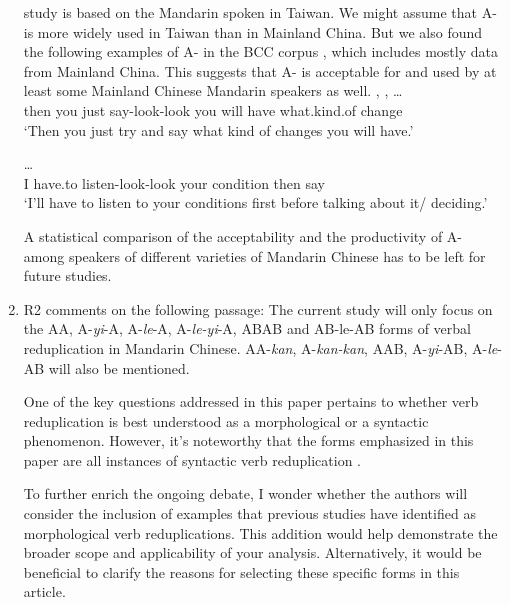 \documentclass[fleqn,twoside]{article}
\begin{document}
\begin{enumerate}
 study is based on the Mandarin spoken in Taiwan.
We might assume that A- is more widely used in Taiwan than in Mainland China.
But we also found the following examples of A- in the BCC corpus \citep{BCC}, which includes mostly data from Mainland China.
This suggests that A- is acceptable for and used by at least some Mainland Chinese Mandarin speakers as well.
\ea %
\gll {},   ,     \ldots\\
then you just say-look-look you will have what.kind.of change\\
\glt `Then you just try and say what kind of changes you will have.'
\z

\ea %
\gll {}      \ldots\\
I have.to listen-look-look your condition then say\\
\glt `I'll have to listen to your conditions first before talking about it/ deciding.'
\z

A statistical comparison of the acceptability and the productivity of A- among speakers of different varieties of Mandarin Chinese has to be left for future studies.

\item
\begin{displayquote}
R2 comments on the following passage: The current study will only focus on the AA, A-\textit{yi}-A, A-\textit{le}-A, A-\textit{le-yi}-A, ABAB and
AB-le-AB forms of verbal reduplication in Mandarin Chinese. AA-\textit{kan}, A-\textit{kan-kan},
AAB, A-\textit{yi}-AB, A-\textit{le}-AB will also be mentioned.
\end{displayquote}

One of the key questions addressed in this paper pertains to whether verb reduplication is best understood as a morphological or a syntactic phenomenon. However, it's noteworthy that the forms emphasized in this paper are all instances of syntactic verb reduplication \citep{Xie2020}.

To further enrich the ongoing debate, I wonder whether the authors will consider the inclusion of examples that previous studies have identified as morphological verb reduplications. This addition would help demonstrate the broader scope and applicability of your analysis. Alternatively, it would be beneficial to clarify the reasons for selecting these specific forms in this article.


\end{enumerate}
\end{document}
